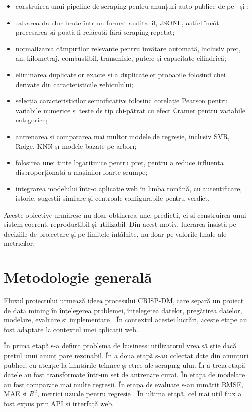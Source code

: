 \begin{itemize}
    \item construirea unui pipeline de scraping pentru anunțuri auto publice de pe \autovit\ și \mobilede;
    \item salvarea datelor brute într-un format auditabil, JSONL, astfel încât procesarea să poată fi refăcută fără scraping repetat;
    \item normalizarea câmpurilor relevante pentru învățare automată, inclusiv preț, an, kilometraj, combustibil, transmisie, putere și capacitate cilindrică;
    \item eliminarea duplicatelor exacte și a duplicatelor probabile folosind chei derivate din caracteristicile vehiculului;
    \item selecția caracteristicilor semnificative folosind corelație Pearson pentru variabile numerice și teste de tip chi-pătrat cu efect Cramer pentru variabile categorice;
    \item antrenarea și compararea mai multor modele de regresie, inclusiv SVR, Ridge, KNN și modele bazate pe arbori;
    \item folosirea unei ținte logaritmice pentru preț, pentru a reduce influența disproporționată a mașinilor foarte scumpe;
    \item integrarea modelului într-o aplicație web în limba română, cu autentificare, istoric, sugestii similare și controale configurabile pentru verdict.
\end{itemize}

Aceste obiective urmăresc nu doar obținerea unei predicții, ci și construirea unui sistem coerent, reproductibil și utilizabil. Din acest motiv, lucrarea insistă pe deciziile de proiectare și pe limitele întâlnite, nu doar pe valorile finale ale metricilor.

\section{Metodologie generală}
\label{sec:intro-method}

Fluxul proiectului urmează ideea procesului CRISP-DM, care separă un proiect de data mining în înțelegerea problemei, înțelegerea datelor, pregătirea datelor, modelare, evaluare și implementare \cite{shearer2000crispdm}. În contextul acestei lucrări, aceste etape au fost adaptate la contextul unei aplicații web.

În prima etapă s-a definit problema de business: utilizatorul vrea să știe dacă prețul unui anunț pare rezonabil. În a doua etapă s-au colectat date din anunțuri publice, cu atenție la limitările tehnice și etice ale scraping-ului. În a treia etapă datele au fost transformate într-un set de antrenare curat. În etapa de modelare au fost comparate mai multe regresii. În etapa de evaluare s-au urmărit RMSE, MAE și \(R^2\), metrici uzuale pentru regresie \cite{sklearn_metrics}. În ultima etapă, cel mai util flux a fost expus prin API și interfață web.

